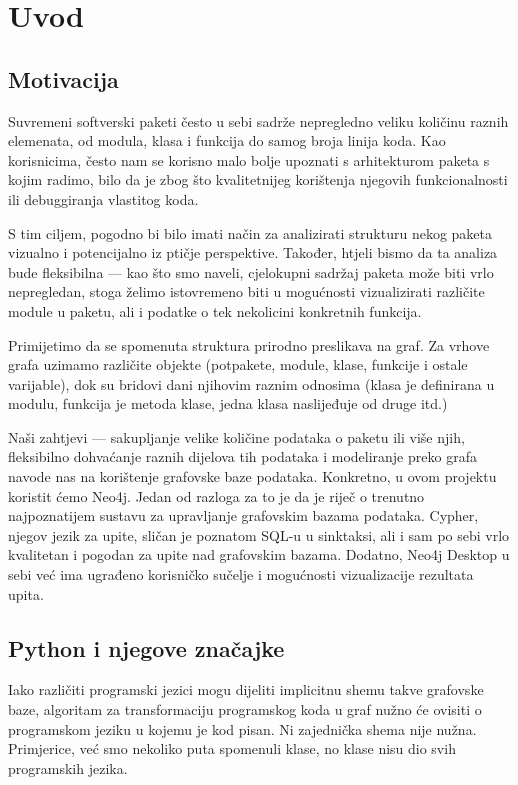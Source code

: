 \section{Uvod} \label{sec:uvod}
\subsection{Motivacija}
Suvremeni softverski paketi često u sebi sadrže nepregledno veliku količinu raznih elemenata, od modula, klasa i funkcija do samog broja linija koda. Kao korisnicima, često nam se korisno malo bolje upoznati s arhitekturom paketa s kojim radimo, bilo da je zbog što kvalitetnijeg korištenja njegovih funkcionalnosti ili debuggiranja vlastitog koda.


S tim ciljem, pogodno bi bilo imati način za analizirati strukturu nekog paketa vizualno i potencijalno iz ptičje perspektive.
 Također, htjeli bismo da ta analiza bude fleksibilna --- kao što smo naveli, cjelokupni sadržaj paketa može biti vrlo nepregledan, stoga želimo istovremeno biti u mogućnosti vizualizirati različite module u paketu, ali i podatke o tek nekolicini konkretnih funkcija.


Primijetimo da se spomenuta struktura prirodno preslikava na graf.
Za vrhove grafa uzimamo različite objekte (potpakete, module, klase, funkcije i ostale varijable), dok su bridovi dani njihovim raznim odnosima (klasa je definirana u modulu, funkcija je metoda klase, jedna klasa naslijeđuje od druge itd.) 


Naši zahtjevi --- sakupljanje velike količine podataka o paketu ili više
njih, fleksibilno dohvaćanje raznih dijelova tih podataka i
modeliranje preko grafa navode nas na korištenje grafovske baze podataka. Konkretno, u ovom projektu koristit ćemo Neo4j.
Jedan od razloga za to je da je riječ o trenutno najpoznatijem sustavu
za upravljanje grafovskim bazama podataka. Cypher, njegov jezik za upite,
sličan je poznatom SQL-u u sinktaksi, ali i sam po sebi vrlo kvalitetan i pogodan za upite nad grafovskim bazama.
Dodatno, Neo4j Desktop u sebi već ima ugrađeno korisničko sučelje i
mogućnosti vizualizacije rezultata upita.


\subsection{Python i njegove značajke} \label{subsec:python}
Iako različiti programski jezici mogu dijeliti implicitnu shemu takve
grafovske baze, algoritam za transformaciju programskog koda u graf 
nužno će ovisiti o programskom jeziku u kojemu je kod pisan.
Ni zajednička shema nije nužna. Primjerice, već smo nekoliko puta spomenuli klase, no klase nisu dio svih programskih jezika.


